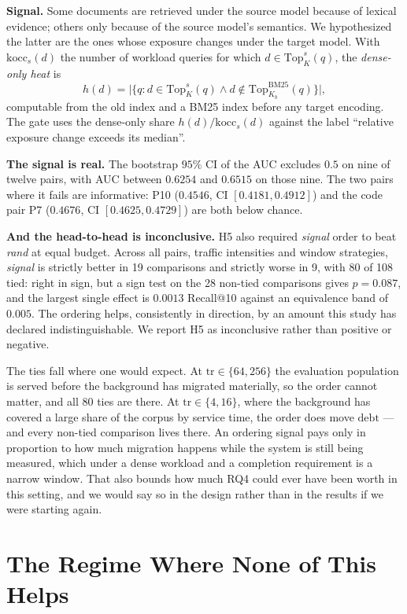 \documentclass[conference]{IEEEtran}
\newcommand{\topk}{\mathrm{Top}}
\newcommand{\debt}{\mathrm{debt}}
\begin{document}
\textbf{Signal.} Some documents are retrieved under the source model because of lexical
evidence; others only because of the source model's semantics. We hypothesized the latter
are the ones whose exposure changes under the target model. With
$\mathrm{kocc}_s(d)$ the number of workload queries for which $d\in\topk_K^{s}(q)$, the
\emph{dense-only heat} is
\[
h(d) = \bigl\lvert\{q : d\in\topk_K^{s}(q) \wedge d\notin\topk_{K_b}^{\mathrm{BM25}}(q)\}\bigr\rvert ,
\]
computable from the old index and a BM25 index before any target encoding. The gate uses
the dense-only share $h(d)/\mathrm{kocc}_s(d)$ against the label ``relative exposure
change exceeds its median''.

\textbf{The signal is real.} The bootstrap $95\%$ CI of the AUC excludes $0.5$ on nine of
twelve pairs, with AUC between $0.6254$ and $0.6515$ on those nine. The two pairs where it
fails are informative: P10 ($0.4546$, CI $[0.4181, 0.4912]$) and the code pair P7
($0.4676$, CI $[0.4625, 0.4729]$) are both below chance.

\textbf{And the head-to-head is inconclusive.} H5 also required \emph{signal} order to beat
\emph{rand} at equal budget. Across all pairs, traffic intensities and window strategies,
\emph{signal} is strictly better in 19 comparisons and strictly worse in 9, with 80 of 108
tied: right in sign, but a sign test on the 28 non-tied comparisons gives $p = 0.087$, and the
largest single effect is $0.0013$ Recall@10 against an equivalence band of $0.005$. The
ordering helps, consistently in direction, by an amount this study has declared
indistinguishable. We report H5 as inconclusive rather than positive or negative.

The ties fall where one would expect. At $\mathrm{tr} \in \{64, 256\}$ the evaluation
population is served before the background has migrated materially, so the order cannot
matter, and all 80 ties are there. At $\mathrm{tr} \in \{4, 16\}$, where the background has
covered a large share of the corpus by service time, the order does move $\debt$ --- and every
non-tied comparison lives there. An ordering signal pays only in proportion to how much
migration happens while the system is still being measured, which under a dense workload and
a completion requirement is a narrow window. That also bounds how much RQ4 could ever have
been worth in this setting, and we would say so in the design rather than in the results if we
were starting again.

\section{The Regime Where None of This Helps}\label{sec:regime}
\end{document}
